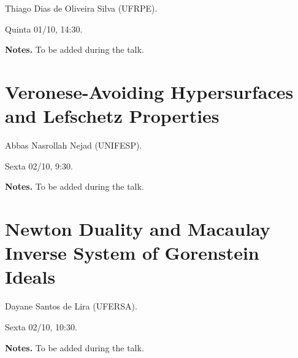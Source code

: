 Thiago Dias de Oliveira Silva (UFRPE).

Quinta 01/10, 14:30.

\medskip\noindent
\textbf{Notes.}
To be added during the talk.

\section{Veronese-Avoiding Hypersurfaces and
Lefschetz Properties}
\label{section-abbas-nejad}

Abbas Nasrollah Nejad (UNIFESP).

Sexta 02/10, 9:30.

\medskip\noindent
\textbf{Notes.}
To be added during the talk.

\section{Newton Duality and Macaulay Inverse
System
of Gorenstein Ideals}
\label{section-dayane-lira}

Dayane Santos de Lira (UFERSA).

Sexta 02/10, 10:30.

\medskip\noindent
\textbf{Notes.}
To be added during the talk.



